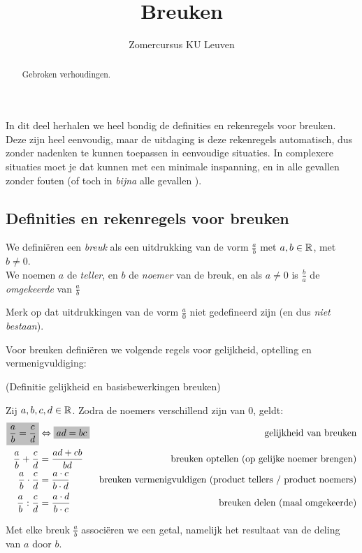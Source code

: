 \documentclass[numbers]{ximera}
\author{Zomercursus KU Leuven}
\title[Rekenvaardigheden:]{Breuken}
\begin{document}
\begin{abstract}
	Gebroken verhoudingen.
\end{abstract}
\maketitle

In dit deel herhalen we heel bondig de definities en rekenregels voor
breuken. Deze zijn heel eenvoudig, maar de uitdaging is deze rekenregels automatisch, dus zonder nadenken te kunnen toepassen in eenvoudige situaties. In complexere situaties moet je dat kunnen met een minimale inspanning, en in alle gevallen zonder fouten (of toch in \textit{bijna} alle gevallen \Smiley).

\subsection{Definities en rekenregels voor breuken}
We definiëren een \textit{breuk} als een uitdrukking van de vorm $\frac{a}{b}$ met $a,b\in\mathbb{R}$, met $b\neq0$. 
\\We noemen $a$ de \textit{teller}, en $b$ de \textit{noemer} van de breuk, en als $a\neq0$ is $\frac ba$ de \textit{omgekeerde} van $\frac ab$ 

Merk op dat uitdrukkingen van de vorm $\frac a0$ niet gedefineerd zijn (en dus \textit{niet bestaan}).  

Voor breuken definiëren we volgende regels voor gelijkheid, optelling en vermenigvuldiging: 

\begin{definition} (Definitie gelijkheid en basisbewerkingen breuken)
	
Zij $a,b,c,d\in \mathbb{R}$. Zodra de noemers verschillend zijn van $0$, geldt:
\begin{align*}
		\important{\frac{a}{b} = \frac{c}{d}}  &\iff \important{ad = bc} 
			& \textrm{gelijkheid van breuken} \\
		\frac{a}{b}+\frac{c}{d} &= \frac{ad+cb}{bd} 
			& \textrm{breuken optellen (op gelijke noemer brengen)} \\
		\frac{a}{b} \cdot \frac{c}{d} &= \frac{a\cdot c}{b\cdot d} 
			& \textrm{breuken vermenigvuldigen (product tellers $/$ product noemers)} \\
		\frac{a}{b} : \frac{c}{d} &= \frac{a\cdot d}{b\cdot c} 
		& \textrm{breuken delen (maal omgekeerde)} \\
\end{align*}
	
\end{definition}
Met elke breuk $\frac ab$ associëren we een getal, namelijk het resultaat van de deling van $a$ door $b$.
\end{document}
